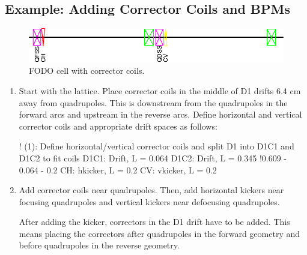 \documentclass{hitec}     %
\begin{document}
{{{{\subsection{Example: Adding Corrector Coils and BPMs}

\begin{figure}[!h]
  \centering
  \includegraphics[width=0.9\linewidth]{figures/correctors.pdf}
  \caption{FODO cell with corrector coils.}
  \label{f:corrector}
\end{figure}

\begin{enumerate}[leftmargin=*]
\item Start with the  lattice. Place corrector coils in the middle of D1 drifts 6.4 cm away from quadrupoles. This is downstream from the quadrupoles in the forward arcs and upstream in the reverse arcs. Define horizontal and vertical corrector coils and appropriate drift spaces as follows:
\begin{code}
! (1): Define horizontal/vertical corrector coils and 
        split D1 into D1C1 and D1C2 to fit coils
D1C1: Drift, L = 0.064
D1C2: Drift, L = 0.345 !0.609 - 0.064 - 0.2
CH: hkicker, L = 0.2
CV: vkicker, L = 0.2
\end{code}
\item Add corrector coils near quadrupoles. Then, add horizontal kickers near focusing quadrupoles and vertical kickers near defocusing quadrupoles. 

After adding the kicker, correctors in the D1 drift have to be added. This means placing the correctors after quadrupoles in the forward geometry and before quadrupoles in the reverse geometry. 


\end{enumerate}}}}}
\end{document}
